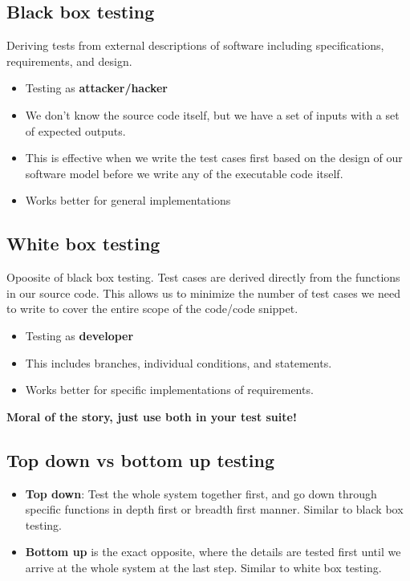 \documentclass[12pt]{book}
\begin{document}
\subsection*{Black box testing}
Deriving tests from external descriptions of software including specifications, requirements, and design.
\begin{itemize}
  \item Testing as \textbf{attacker/hacker}
  \item We don't know the source code itself, but we have a set of inputs with a set of expected outputs.
  \item This is effective when we write the test cases first based on the design of our software model before we write any of the executable code itself.
  \item Works better for general implementations
\end{itemize}

\subsection*{White box testing}
Opoosite of black box testing. Test cases are derived directly from the functions in our source code. This allows us to minimize the number of test cases we need to write to cover the entire scope of the code/code snippet.
\begin{itemize}
  \item Testing as \textbf{developer}
  \item This includes branches, individual conditions, and statements.
  \item Works better for specific implementations of requirements.
\end{itemize}

\textbf{Moral of the story, just use both in your test suite!}

\subsection*{Top down vs bottom up testing}
\begin{itemize}
  \item \textbf{Top down}: Test the whole system together first, and go down through specific functions in depth first or breadth first manner. Similar to black box testing.
  \item \textbf{Bottom up} is the exact opposite, where the details are tested first until we arrive at the whole system at the last step. Similar to white box testing.
\end{itemize}
\end{document}

